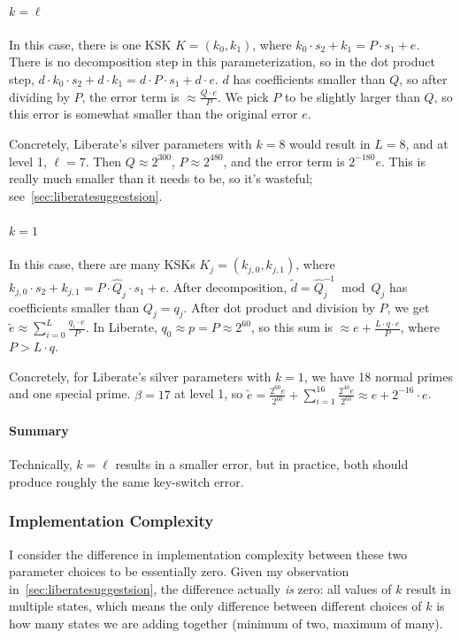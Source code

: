\documentclass[../../fheimpl.tex]{subfiles}
\begin{document}
\paragraph{$k=\ell$}
In this case, there is one KSK $K=(k_0, k_1)$, where $k_0\cdot s_2 + k_1 = P\cdot s_1+e$. There is no decomposition step in this parameterization, so in the dot product step, $d\cdot k_0\cdot s_2 + d\cdot k_1 = d\cdot P\cdot s_1 + d\cdot e$. $d$ has coefficients smaller than $Q$, so after dividing by $P$, the error term is $\approx \frac{Q\cdot e}{P}$. We pick $P$ to be slightly larger than $Q$, so this error is somewhat smaller than the original error $e$.

Concretely, Liberate's silver parameters with $k=8$ would result in $L=8$, and at level 1, $\ell=7$. Then $Q\approx 2^{300}$, $P\approx 2^{480}$, and the error term is $2^{-180}e$. This is really much smaller than it needs to be, so it's wasteful; see~\cref{sec:liberatesuggestsion}.

\paragraph{$k=1$}
In this case, there are many KSKs $K_j=(k_{j,0}, k_{j,1})$, where $k_{j,0}\cdot s_2 + k_{j,1} = P\cdot\hat{Q}_j\cdot s_1+e$. After decomposition, $\tilde{d}=\hat{Q}_j^{-1} \bmod Q_j$ has coefficients smaller than $Q_j=q_j$. After dot product and division by $P$, we get $\tilde{e}\approx\sum_{i=0}^{L} \frac{q_i\cdot e}{P}$. In Liberate, $q_0 \approx p=P\approx 2^{60}$, so this sum is $\approx e+\frac{L\cdot q\cdot e}{P}$, where $P>L\cdot q$.

Concretely, for Liberate's silver parameters with $k=1$, we have 18 normal primes and one special prime. $\beta=17$ at level 1, so $\tilde{e}=\frac{2^{60}e}{2^{60}} + \sum_{i=1}^{16} \frac{2^{40}e}{2^{60}} \approx e+ 2^{-16}\cdot e$.

\paragraph{Summary}
Technically, $k=\ell$ results in a smaller error, but in practice, both should produce roughly the same key-switch error.

\subsubsection{Implementation Complexity}
I consider the difference in implementation complexity between these two parameter choices to be essentially zero. Given my observation in~\cref{sec:liberatesuggestsion}, the difference actually \emph{is} zero: all values of $k$ result in multiple states, which means the only difference between different choices of $k$ is how many states we are adding together (minimum of two, maximum of many).
\end{document}
